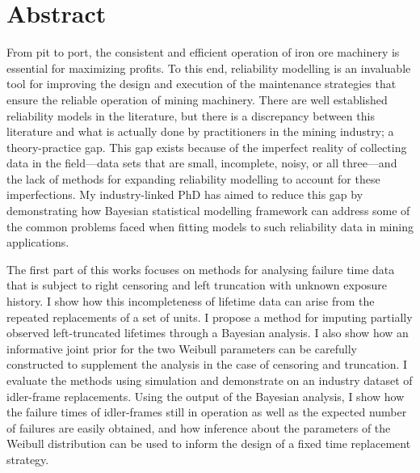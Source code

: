 
\chapter*{Abstract} 

From pit to port, the consistent and efficient operation of iron ore machinery is essential for maximizing profits. To this end, reliability modelling is an invaluable tool for improving the design and execution of the maintenance strategies that ensure the reliable operation of mining machinery. There are well established reliability models in the literature, but there is a discrepancy between this literature and what is actually done by practitioners in the mining industry; a theory-practice gap. This gap exists because of the imperfect reality of collecting data in the field---data sets that are small, incomplete, noisy, or all three---and the lack of methods for expanding reliability modelling to account for these imperfections. My industry-linked PhD has aimed to reduce this gap by demonstrating how Bayesian statistical modelling framework can address some of the common problems faced when fitting models to such reliability data in mining applications.

The first part of this works focuses on methods for analysing failure time data that is subject to right censoring and left truncation with unknown exposure history. I show how this incompleteness of lifetime data can arise from the repeated replacements of a set of units. I propose a method for imputing partially observed left-truncated lifetimes through a Bayesian analysis. I also show how an informative joint prior for the two Weibull parameters can be carefully constructed to supplement the analysis in the case of censoring and truncation. I evaluate the methods using simulation and demonstrate on an industry dataset of idler-frame replacements. Using the output of the Bayesian analysis, I show how the failure times of idler-frames still in operation as well as the expected number of failures are easily obtained, and how inference about the parameters of the Weibull distribution can be used to inform the design of a fixed time replacement strategy.


